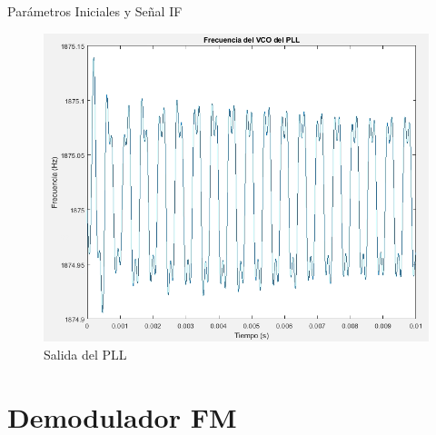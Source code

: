 \documentclass[mathserif,spanish]{beamer}
\begin{document}
\begin{frame}{Parámetros Iniciales y Señal IF}
 
    \begin{figure}[h]
        \centering
        \includegraphics[scale=0.25]{signal_pll.png}
        \caption{Salida del PLL}
    \end{figure}
    
\end{frame}

























\section{Demodulador FM}
\end{document}
